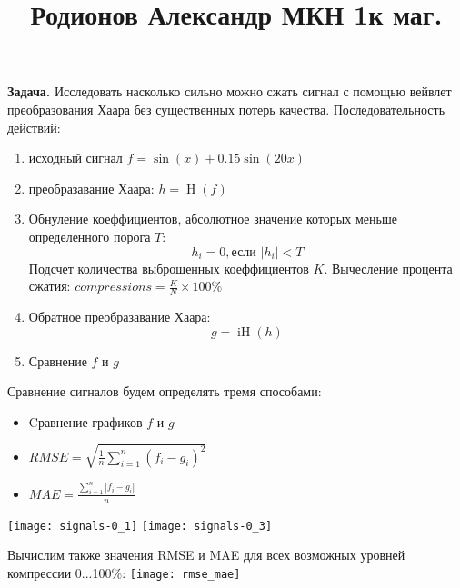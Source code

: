 \documentclass[a4paper, 12pt]{article}
\title{\large{Родионов Александр МКН 1к маг.}}
\date{}
\DeclareMathOperator{\Haar}{H}
\DeclareMathOperator{\iHaar}{iH}
\begin{document}
\maketitle
\vspace{-2cm}


\begin{multicols}{2}

\noindent\textbf{Задача.} Исследовать насколько сильно можно сжать сигнал с помощью вейвлет преобразования Хаара без существенных потерь качества. Последовательность действий: 

\begin{enumerate}
  \item исходный сигнал $f = \sin(x) + 0.15\sin(20x)$
  \item преобразавание Хаара: $h = \Haar(f)$
  \item Обнуление коеффициентов, абсолютное значение которых меньше определенного порога $T$: $$h_{i} = 0, \text{если }\mathopen|h_{i}|< T$$ Подсчет количества выброшенных коеффициентов $K$. Вычесление процента сжатия:  $compressions = \frac{K}{N} \times 100\%$
  \item Обратное преобразавание Хаара: $$g = \iHaar(h)$$
  \item Сравнение $f$ и $g$
\end{enumerate}

Сравнение сигналов будем определять тремя способами: 


\begin{itemize}
  \item Cравнение графиков $f$ и $g$
  \item $RMSE = \sqrt{    \frac{1}{n} \sum_{i=1}^{n}(f_{i} - g_{i})^2}    $
  \item $MAE = \frac{\sum_{i=1}^{n}|f_{i} - g_{i}|}{n}$
\end{itemize}



% 



% 
% 

\end{multicols}

\vspace{1cm}
\centering
\texttt{[image: signals-0\_1]}
\texttt{[image: signals-0\_3]}

Вычислим также значения RMSE и MAE для всех возможных уровней компрессии 0...100\%:
\vspace{2cm}
\texttt{[image: rmse\_mae]}

\end{document}

